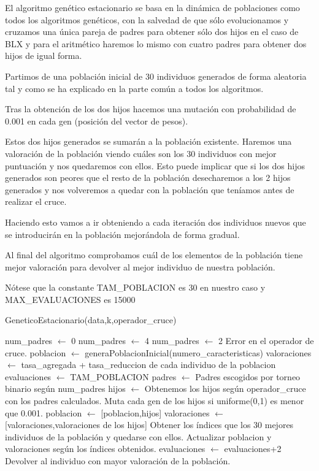 \documentclass[12pt,a4paper]{article}
\begin{document}
	El algoritmo genético estacionario se basa en la dinámica de poblaciones como todos los algoritmos genéticos, con la salvedad de que sólo evolucionamos y cruzamos una única pareja de padres para obtener sólo dos hijos en el caso de BLX y para el aritmético haremos lo mismo con cuatro padres para obtener dos hijos de igual forma.
	
	Partimos de una población inicial de 30 individuos generados de forma aleatoria tal y como se ha explicado en la parte común a todos los algoritmos.
	
	Tras la obtención de los dos hijos hacemos una mutación con probabilidad de 0.001 en cada gen (posición del vector de pesos).
	
	Estos dos hijos generados se sumarán a la población existente. Haremos una valoración de la población viendo cuáles son los 30 individuos con mejor puntuación y nos quedaremos con ellos. Esto puede implicar que si los dos hijos generados son peores que el resto de la población desecharemos a los 2 hijos generados y nos volveremos a quedar con la población que teníamos antes de realizar el cruce.
	
	Haciendo esto vamos a ir obteniendo a cada iteración dos individuos nuevos que se introducirán en la población mejorándola de forma gradual.
	
	Al final del algoritmo comprobamos cuál de los elementos de la población tiene mejor valoración para devolver al mejor individuo de nuestra población.
	
	Nótese que la constante TAM\_POBLACION es 30 en nuestro caso y MAX\_EVALUACIONES es 15000
	
	\begin{algorithm}
		\caption{GeneticoEstacionario(data,k,operador\_cruce)}
		\begin{algorithmic}
			\STATE num\_padres $\leftarrow$ 0
				\STATE num\_padres $\leftarrow$ 4
				\STATE num\_padres $\leftarrow$ 2
			\ELSE
				\STATE Error en el operador de cruce.
			\ENDIF
			\STATE
			\STATE poblacion $\leftarrow$ generaPoblacionInicial(numero\_caracteristicas)
			\STATE valoraciones $\leftarrow$ tasa\_agregada + tasa\_reduccion de cada individuo de la poblacion
			\STATE evaluaciones $\leftarrow$ TAM\_POBLACION
				\STATE padres $\leftarrow$ Padres escogidos por torneo binario según num\_padres
				\STATE hijos $\leftarrow$ Obtenemos los hijos según operador\_cruce con los padres calculados.
				\STATE 
				\STATE Muta cada gen de los hijos si uniforme(0,1) es menor que 0.001.
				\STATE poblacion $\leftarrow$ [poblacion,hijos]
				\STATE valoraciones $\leftarrow$ [valoraciones,valoraciones de los hijos]
				\STATE Obtener los índices que los 30 mejores individuos de la población y quedarse con ellos.
				\STATE Actualizar poblacion y valoraciones según los índices obtenidos.
				\STATE evaluaciones $\leftarrow$ evaluaciones+2
			\ENDWHILE
			\RETURN Devolver al individuo con mayor valoración de la población.
		\end{algorithmic}
	\end{algorithm}
	
\end{document}
